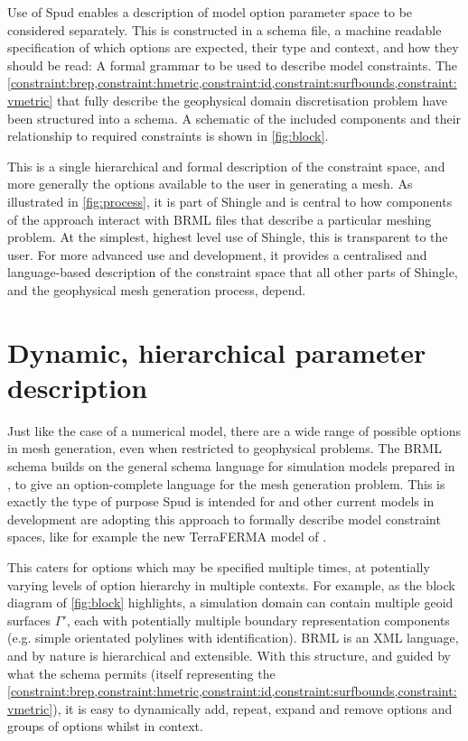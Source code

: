 \documentclass[a4paper, 10pt]{book}
\providecommand{\shingle}{Shingle\xspace}
\providecommand{\brml}{BRML\xspace}
\begin{document}
Use of Spud enables a description of model option parameter space to be considered separately.
%
This is constructed in a schema file, a machine readable specification of which options are expected, their type and context, and how they should be read:
%
A formal grammar to be used to describe model constraints.
%
The 
\cref{constraint:brep,constraint:hmetric,constraint:id,constraint:surfbounds,constraint:vmetric}
that fully describe the 
geophysical domain discretisation problem
have been structured into a schema.
%
A schematic of the included components and their relationship to required constraints is shown in \cref{fig:block}.

This is a single hierarchical and formal description of the constraint space, and more generally the options available to the user in generating a mesh.
As illustrated in \cref{fig:process},
it is part of \shingle and 
is central to how components of the approach interact with \brml files that describe a particular meshing problem.
%
At the simplest, highest level use of \shingle, this is transparent to the user.
%
For more advanced use and development, it provides a centralised and
language-based description of the constraint space that all other parts of
\shingle, and the geophysical mesh generation process, depend.




\section{Dynamic, hierarchical parameter description}
\label{sec:brep}
%
Just like the case of a numerical model,
there are a wide range of possible options in mesh generation,
even when restricted to geophysical problems.
%
The \brml schema builds on the general schema language for simulation models prepared in \cite{ham09},
to give an option-complete language for the mesh generation problem.
%
This is exactly the type of purpose Spud is intended for and other current models in development are adopting this approach to
formally describe model constraint spaces, like for example the new TerraFERMA model of \cite{wilson16}.

This caters for options which may be specified multiple times, at potentially varying levels of option hierarchy in multiple contexts.
%
For example, as the block diagram of \cref{fig:block} highlights,
a simulation domain can contain multiple geoid surfaces $\Gamma'$, each with potentially multiple boundary representation components (e.g. simple orientated polylines with identification).
%
\brml is an XML language, and by nature is hierarchical and extensible.
With this structure, and guided by what the schema permits (itself representing the
\cref{constraint:brep,constraint:hmetric,constraint:id,constraint:surfbounds,constraint:vmetric}),
it is easy to dynamically add, repeat, expand and remove options and groups of options whilst in context. 
% 
\end{document}
